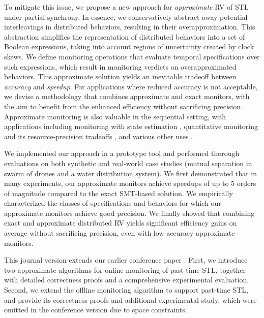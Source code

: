 \documentclass[iicol,lineno]{sn-jnl}
\newcommand{\?}{\text{?}}
\begin{document}
	To mitigate this issue, we propose a new approach for \emph{approximate} RV of STL 
	under partial synchrony.
	In essence, we conservatively abstract away potential interleavings in distributed behaviors, resulting in their overapproximation.
	This abstraction simplifies the representation of distributed behaviors into a set of Boolean 
	expressions, taking into account regions of uncertainty created by clock skews.
	We define monitoring operations that evaluate temporal specifications over such expressions, 
	which result in monitoring verdicts on overapproximated behaviors.
	This approximate solution yields an inevitable tradeoff between {\em accuracy} and {\em speedup}.
	For applications where reduced accuracy is not acceptable, we devise a methodology that combines approximate and exact monitors, 
	with the aim to benefit from the enhanced efficiency without sacrificing 
	precision.
	Approximate monitoring is also valuable in the sequential setting, with applications including
	monitoring with state estimation \cite{StollerBSGHSZ11,BartocciG13},
	quantitative monitoring and its resource-precision tradeoffs \cite{HenzingerS21,HenzingerMS22,HenzingerMS23},
	and various other uses \cite{AlechinaDL14,AcetoAFIL21}.
	
	
	
	We implemented our approach in a prototype tool and performed thorough evaluations on both 
	synthetic and real-world case studies (mutual separation in swarm of drones and a water distribution 
	system).
	We first demonstrated that in many experiments, our approximate monitors achieve 
	speedups of up to 5 orders of magnitude compared to the exact SMT-based solution.
	We empirically characterized the classes of specifications and behaviors for which our approximate 
	monitors achieve good precision.
	We finally showed that combining exact and approximate distributed RV yields significant efficiency gains on average without sacrificing precision, even with low-accuracy approximate monitors.
	
	This journal version extends our earlier conference paper \cite{BonakdarpourMNS24}.
	First, we introduce two approximate algorithms for online monitoring of past-time STL, together with detailed correctness proofs and a comprehensive experimental evaluation.
	Second, we extend the offline monitoring algorithm to support past-time STL, and provide its correctness proofs and additional experimental study, which were omitted in the conference version due to space constraints.
	
\end{document}
